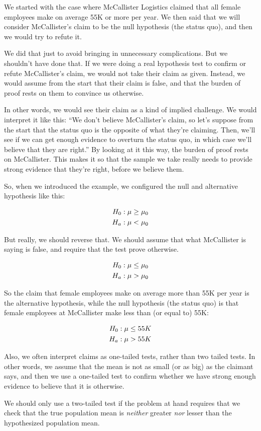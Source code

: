 \documentclass[../../../main.tex]{subfiles}
\begin{document}
We started with the case where McCallister Logistics claimed that all female employees make on average 55K or more per year. We then said that we will consider McCallister's claim to be the null hypothesis (the status quo), and then we would try to refute it.

We did that just to avoid bringing in unnecessary complications. But we shouldn't have done that. If we were doing a real hypothesis test to confirm or refute McCallister's claim, we would not take their claim as given. Instead, we would assume from the start that their claim is false, and that the burden of proof rests on them to convince us otherwise.

In other words, we would see their claim as a kind of implied challenge. We would interpret it like this: ``We don't believe McCallister's claim, so let's suppose from the start that the status quo is the opposite of what they're claiming. Then, we'll see if we can get enough evidence to overturn the status quo, in which case we'll believe that they are right.'' By looking at it this way, the burden of proof rests on McCallister. This makes it so that the sample we take really needs to provide strong evidence that they're right, before we believe them.

So, when we introduced the example, we configured the null and alternative hypothesis like this:

\begin{align*}
  \NullHyp/: \populationmean \geq \HypPopMean/ \\
  \AltHyp/: \populationmean < \HypPopMean/
\end{align*}

\noindent
But really, we should reverse that. We should assume that what McCallister is saying is false, and require that the test prove otherwise. 

\begin{align*}
  \NullHyp/: \populationmean \leq \HypPopMean/ \\
  \AltHyp/: \populationmean > \HypPopMean/
\end{align*}

\noindent
So the claim that female employees make on average more than 55K per year is the alternative hypothesis, while the null hypothesis (the status quo) is that female employees at McCallister make less than (or equal to) 55K:

\begin{align*}
  \NullHyp/: \populationmean \leq 55K \\
  \AltHyp/: \populationmean > 55K
\end{align*}

\noindent
Also, we often interpret claims as one-tailed tests, rather than two tailed tests. In other words, we assume that the mean is not as small (or as big) as the claimant says, and then we use a one-tailed test to confirm whether we have strong enough evidence to believe that it is otherwise. 

We should only use a two-tailed test if the problem at hand requires that we check that the true population mean is \emph{neither} greater \emph{nor} lesser than the hypothesized population mean.
\end{document}
